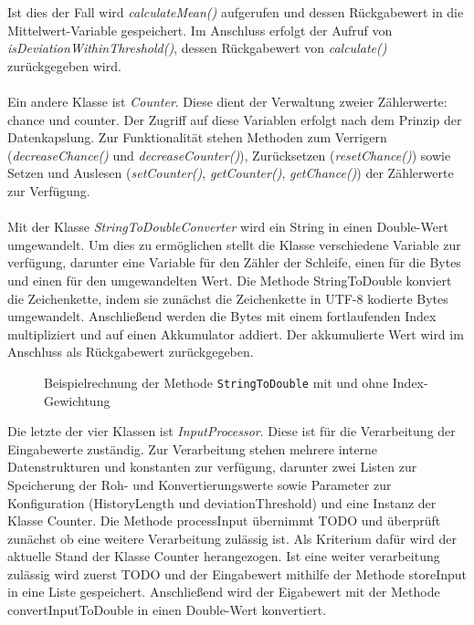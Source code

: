 \documentclass{article}
\begin{document}
    Ist dies der Fall wird \textit{calculateMean()} aufgerufen und dessen Rückgabewert in die Mittelwert-Variable gespeichert.
    Im Anschluss erfolgt der Aufruf von \textit{isDeviationWithinThreshold()}, dessen Rückgabewert von \textit{calculate()} zurückgegeben wird.\\
    \\
    Ein andere Klasse ist \textit{Counter}.
    Diese dient der Verwaltung zweier Zählerwerte: chance und counter.
    Der Zugriff auf diese Variablen erfolgt nach dem Prinzip der Datenkapslung.
    Zur Funktionalität stehen Methoden zum Verrigern (\textit{decreaseChance()} und \textit{decreaseCounter()}), Zurücksetzen (\textit{resetChance()}) sowie Setzen und Auslesen (\textit{setCounter()}, \textit{getCounter()}, \textit{getChance()}) der Zählerwerte zur Verfügung.\\
    \\
    Mit der Klasse \textit{StringToDoubleConverter} wird ein String in einen Double-Wert umgewandelt.
    Um dies zu ermöglichen stellt die Klasse verschiedene Variable zur verfügung, darunter eine Variable für den Zähler der Schleife, einen für die Bytes und einen für den umgewandelten Wert.
    Die Methode StringToDouble konviert die Zeichenkette, indem sie zunächst die Zeichenkette in UTF-8 kodierte Bytes umgewandelt.
    Anschließend werden die Bytes mit einem fortlaufenden Index multipliziert und auf einen Akkumulator addiert.
    Der akkumulierte Wert wird im Anschluss als Rückgabewert zurückgegeben.
    \begin{figure}[H]
        \caption{Beispielrechnung der Methode \texttt{StringToDouble} mit und ohne Index-Gewichtung}
        \label{Beispielrechnung}
    \end{figure}
    \noindent
    Die letzte der vier Klassen ist \textit{InputProcessor}.
    Diese ist für die Verarbeitung der Eingabewerte zuständig.
    Zur Verarbeitung stehen mehrere interne Datenstrukturen und konstanten zur verfügung, darunter zwei Listen zur Speicherung der Roh- und Konvertierungswerte sowie Parameter zur Konfiguration (HistoryLength und deviationThreshold) und eine Instanz der Klasse Counter.
    Die Methode processInput übernimmt TODO und überprüft zunächst ob eine weitere Verarbeitung zulässig ist. 
    Als Kriterium dafür wird der aktuelle Stand der Klasse Counter herangezogen.
    Ist eine weiter verarbeitung zulässig wird zuerst TODO und der Eingabewert mithilfe der Methode storeInput in eine Liste gespeichert.
    Anschließend wird der Eigabewert mit der Methode convertInputToDouble in einen Double-Wert konvertiert.
\end{document}
